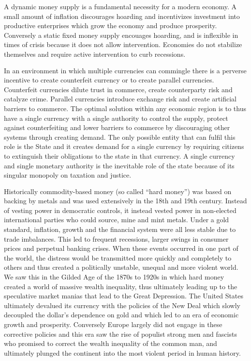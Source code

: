 \documentclass[
]{book}
\begin{document}
A dynamic money supply is a fundamental necessity for a modern economy. A small amount of inflation discourages hoarding and incentivizes investment into productive enterprises which grow the economy and produce prosperity. Conversely a static fixed money supply encouages hoarding, and is inflexible in times of crisis because it does not allow intervention. Economies do not stabilize themselves and require active intervention to curb recessions.

In an environment in which multiple currencies can commingle there is a perverse incentive to create counterfeit currency or to create parallel currencies. Counterfeit currencies dilute trust in commerce, create counterparty risk and catalyze crime. Parallel currencies introduce exchange risk and create artificial barriers to commerce. The optimal solution within any economic region is to thus have a single currency with a single authority to control the supply, protect against counterfeiting and lower barriers to commerce by discouraging other systems through creating demand. The only possible entity that can fulfil this role is the State and it creates demand for a single currency by requiring citizens to extinguish their obligations to the state in that currency. A single currency and single monetary authority is the inevitable role of the state because of its singular monopoly on taxation and justice.

Historically commodity-based money (so called ``hard money'') was based on backing by metals and was used extensively in the 18th and 19th century. Instead of vesting power in democratic controls, it instead vested power in non-elected international parties who could source, mine and mint metals. Under a gold standard, inflation, growth and the financial system were all less stable due to trade imbalances. This led to frequent recessions, larger swings in consumer prices and perpetual banking crises. When these events occurred in one part of the world, the distress would be transmitted more quickly and completely to others and thus created a politically unstable, unequal and more violent world. We saw this in the Gilded Age of the 1870s to 1920s in which hard money created a world of massive wealth inequality, thus ultimately leading up to the speculative market manias that lead to the Great Depression. The United States ultimately devalued its currency with the policies of the New Deal which slowly decoupled the dollar's dependence on gold and which led to an era of economic growth and prosperity. Conversely Europe largely did not engage in these corrective policies and this era saw the rise of populist strong men and fascists who promised to correct the wealth inequality of the common man, and ultimately plunged the continent into the most violent period in human history.
\end{document}
